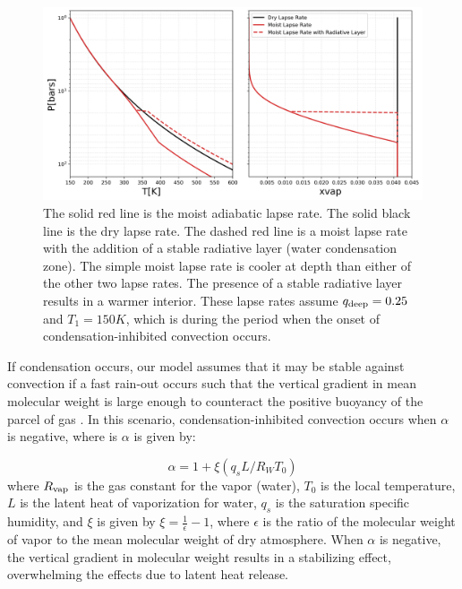 \documentclass[11pt]{ucscthesisbs}
\begin{document}
\begin{figure}[ht!]
 \centerline{
  \includegraphics[width=6.5in]{figures/comparison_dry_vs_moist_lapse_rates.png}
 }
\caption[A Standard Interior Structure Model]
{The solid red line is the moist adiabatic lapse rate. The solid black line is the dry lapse rate. The dashed red line is a moist lapse rate with the addition of a stable radiative layer (water condensation zone). The simple moist lapse rate is cooler at depth than either of the other two lapse rates. The presence of a stable radiative layer results in a warmer interior. These lapse rates assume $q_{\rm deep} = 0.25$ and $T_{1} = 150K$, which is during the period when the onset of condensation-inhibited convection occurs.}
\label{fig:standard_dry_interior}
\end{figure}


If condensation occurs, our model assumes that it may be stable against convection if a fast rain-out occurs such that the vertical gradient in mean molecular weight is large enough to counteract the positive buoyancy of the parcel of gas \citep{leconte_2017} \citep{friedson_2017}. In this scenario, condensation-inhibited convection occurs when $\alpha$ is negative, where is $\alpha$ \citep{friedson_2017} is given by:

\begin{equation}
  \alpha = 1 + \xi (q_{s} L / R_{W} T_{0}) 
  \label{eq:alpha}
\end{equation}
where $R_{\rm vap}$ is the gas constant for the vapor (water), $T_{0}$ is the local temperature, $L$ is the latent heat of vaporization for water, $q_{s}$ is the saturation specific humidity, and $\xi$ is given by $\xi = \frac{1}{\epsilon} - 1$, where $\epsilon$ is the ratio of the molecular weight of vapor to the mean molecular weight of dry atmosphere. When $\alpha$ is negative, the vertical gradient in molecular weight results in a stabilizing effect, overwhelming the effects due to latent heat release.
\end{document}
